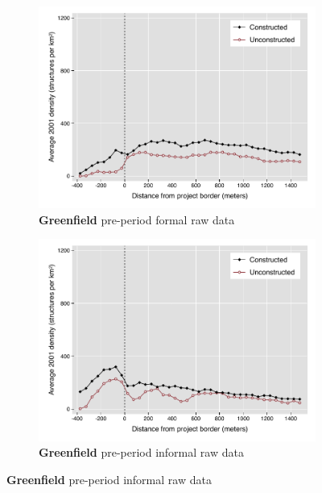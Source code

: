 \documentclass[12pt]{article}
\begin{document}
\begin{figure}
\begin{subfigure}[b]{0.48\textwidth}
        \end{subfigure}
        \begin{subfigure}[b]{0.48\textwidth}
                    \caption[Network2]%
            {{\footnotesize \textbf{Greenfield} pre-period formal  raw data}}    
            \label{fig:prefor}
            \centering
            \includegraphics[width=\textwidth,trim={0.3cm .3cm 0.1cm 0cm}, clip=true]{figures/bblu_for_pre_means_4_1_spk.pdf}

        \end{subfigure}
        \hfill
        \begin{subfigure}[b]{0.48\textwidth}  
                    \caption[]%
            {{\footnotesize \textbf{Greenfield} pre-period informal  raw data}}     
            \label{fig:preinf}
            \centering 
            \includegraphics[width=\textwidth,trim={0.3cm .3cm 0.1cm 0cm}, clip=true]{figures/bblu_inf_pre_means_4_1_spk.pdf}


\end{subfigure}
\end{figure}
\end{document}
